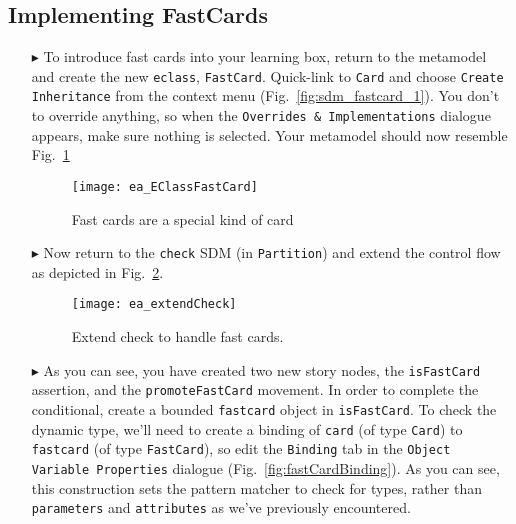 \newpage
\subsection{Implementing FastCards}
\visHeader
\hypertarget{fastCard vis}{}

\begin{itemize}

\item[$\blacktriangleright$] To introduce fast cards into your learning box, return to the metamodel and create the new \texttt{eclass}, \texttt{FastCard}.
Quick-link to \texttt{Card} and choose \texttt{Create Inheritance} from the context menu (Fig.~\ref{fig:sdm_fastcard_1}). You don't to override anything, so
when the \texttt{Overrides \& Implementations} dialogue appears, make sure nothing is selected. Your metamodel should now resemble
Fig.~\ref{fig:metamodel_FastCard}

\begin{figure}[htp]
\begin{center}
  \texttt{[image: ea\_EClassFastCard]}
  \caption{Fast cards are a special kind of card}  
  \label{fig:metamodel_FastCard}
\end{center}
\end{figure}

\item[$\blacktriangleright$] Now return to the \texttt{check} SDM (in \texttt{Partition}) and extend the control flow as depicted in
Fig.~\ref{fig:extendCheck}.

\begin{figure}[htbp]
\begin{center}
  \texttt{[image: ea\_extendCheck]}
  \caption{Extend check to handle fast cards.}  
  \label{fig:extendCheck}
\end{center}
\end{figure}
 
\item[$\blacktriangleright$] As you can see, you have created two new story nodes, the \texttt{isFastCard} assertion, and the \texttt{promoteFastCard} movement.
In order to complete the conditional, create a bounded \texttt{fastcard} object in \texttt{isFastCard}. To check the dynamic type, we'll need to create a binding
of \texttt{card} (of type \texttt{Card}) to \texttt{fastcard} (of type \texttt{FastCard}), so edit the \texttt{Binding} tab in the \texttt{Object Variable
Properties} dialogue (Fig.~\ref{fig:fastCardBinding}). As you can see, this construction sets the pattern matcher to check for types, rather than
\texttt{parameters} and \texttt{attributes} as we've previously encountered.
  

\end{itemize}
